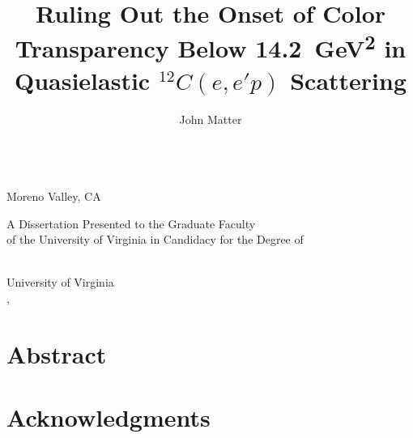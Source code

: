 \title{Ruling Out the Onset of Color Transparency Below \SI{14.2}{\giga\electronvolt\squared} in Quasielastic ${}^{12}C(e,e'p)$ Scattering}
\makeatletter
\bookmark[named=FirstPage]{\@title}
\makeatother

\makeatletter
\author{John Matter} \let\Author\@author
\newcommand{\hometown}{Moreno Valley, CA}

 \let\Year\@degreeyear
{}
\makeatother


\makeatletter
\def\maketitle{\begin{titlepage}
\doublespacing
\vspace{0.0in}
\large
{\LARGE\bf \@title \par}
\@author \\
\hometown
\par
\@prevdegrees
\par
A Dissertation Presented to the Graduate Faculty \\
of the University of Virginia in Candidacy for the Degree of \\
\@degree
\par
\@department \\
University of Virginia \\
\@degreemonth, \@degreeyear \\
\vspace{1.0in}

\begin{flushright}
\begin{minipage}{0.45\linewidth}
\mysignrule{}
\mysignrule{}
\mysignrule{}
\mysignrule{}
\end{minipage}
\end{flushright}

\end{titlepage}}
\makeatother
\maketitle


\cleardoublepage

\vspace{0.8in}
\section*{\center Abstract}


\cleardoublepage

\section*{Acknowledgments}


